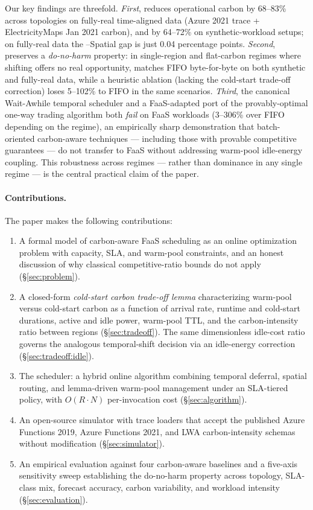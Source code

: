 Our key findings are threefold. \emph{First}, \GreenFaaS{}
reduces operational carbon by 68--83\% across topologies on fully-real
time-aligned data (Azure 2021 trace + ElectricityMaps Jan 2021
carbon), and by 64--72\% on synthetic-workload setups; on fully-real
data the \GreenFaaS{}--Spatial gap is just 0.04 percentage points.
\emph{Second}, \GreenFaaS{} preserves a \emph{do-no-harm} property:
in single-region and flat-carbon regimes where shifting offers no
real opportunity, \GreenFaaS{} matches FIFO byte-for-byte on both
synthetic and fully-real data, while a heuristic ablation (lacking
the cold-start trade-off correction) loses 5--102\% to FIFO in the
same scenarios. \emph{Third}, the canonical Wait-Awhile temporal
scheduler and a FaaS-adapted port of the
\citet{lechowicz2024online} provably-optimal one-way trading
algorithm both \emph{fail} on FaaS workloads (3--306\% over FIFO
depending on the regime), an empirically sharp demonstration that
batch-oriented carbon-aware techniques --- including those with
provable competitive guarantees --- do not transfer to FaaS without
addressing warm-pool idle-energy coupling. This robustness across
regimes --- rather than dominance in any single regime --- is the
central practical claim of the paper.

\paragraph{Contributions.} The paper makes the following contributions:
\begin{enumerate}
\item A formal model of carbon-aware FaaS scheduling as an online
  optimization problem with capacity, SLA, and warm-pool constraints,
  and an honest discussion of why classical competitive-ratio bounds
  do not apply (\S\ref{sec:problem}).
\item A closed-form \emph{cold-start carbon trade-off lemma}
  characterizing warm-pool versus cold-start carbon as a function of
  arrival rate, runtime and cold-start durations, active and idle
  power, warm-pool TTL, and the carbon-intensity ratio between
  regions (\S\ref{sec:tradeoff}). The same dimensionless idle-cost
  ratio governs the analogous temporal-shift decision via an
  idle-energy correction (\S\ref{sec:tradeoff:idle}).
\item The \GreenFaaS{} scheduler: a hybrid online algorithm combining
  temporal deferral, spatial routing, and lemma-driven warm-pool
  management under an SLA-tiered policy, with $O(R \cdot N)$
  per-invocation cost (\S\ref{sec:algorithm}).
\item An open-source simulator with trace loaders that accept the
  published Azure Functions 2019, Azure Functions 2021, and LWA
  carbon-intensity schemas without modification
  (\S\ref{sec:simulator}).
\item An empirical evaluation against four carbon-aware baselines and
  a five-axis sensitivity sweep establishing the do-no-harm property
  across topology, SLA-class mix, forecast accuracy, carbon
  variability, and workload intensity (\S\ref{sec:evaluation}).
\end{enumerate}

